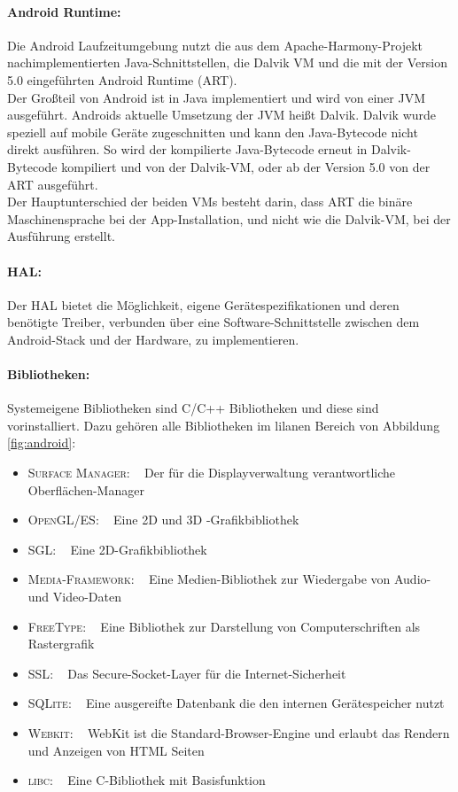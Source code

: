 \paragraph{Android Runtime: }
Die Android Laufzeitumgebung nutzt die aus dem Apache-Harmony-Projekt nachimplementierten Java-Schnittstellen, die Dalvik \gls{VM} und die mit der Version 5.0 eingeführten Android Runtime (ART). \cite{android_5}\\
Der Großteil von Android ist in Java implementiert und wird von einer \gls{JVM} ausgeführt. Androids aktuelle Umsetzung der \gls{JVM} heißt Dalvik. Dalvik wurde speziell auf mobile Geräte zugeschnitten und kann den Java-Bytecode nicht direkt ausführen. So wird der kompilierte Java-Bytecode erneut in Dalvik-Bytecode kompiliert und von der Dalvik-\gls{VM}, oder ab der Version 5.0 von der ART ausgeführt.\\
Der Hauptunterschied der beiden \glspl{VM} besteht darin, dass ART die binäre Maschinensprache bei der \gls{App}-Installation, und nicht wie die Dalvik-\gls{VM}, bei der Ausführung erstellt.
\paragraph{\gls{HAL}: }
Der \gls{HAL} bietet die Möglichkeit, eigene Gerätespezifikationen und deren benötigte Treiber, verbunden über eine Software-Schnittstelle zwischen dem Android-Stack und der Hardware, zu implementieren. \cite{android_hal}
\paragraph{Bibliotheken: }
Systemeigene Bibliotheken sind C/C++ Bibliotheken und diese sind vorinstalliert. Dazu gehören alle Bibliotheken im lilanen Bereich von Abbildung \ref{fig:android}:
\begin{itemize}[leftmargin=0.7cm]
\renewcommand\labelitemi{--}
	\item \textsc{Surface Manager}: ~ Der für die Displayverwaltung verantwortliche Oberflächen-Manager
	\item \textsc{OpenGL/ES}: ~ Eine 2D und 3D -Grafikbibliothek
	\item \textsc{SGL}: ~ Eine 2D-Grafikbibliothek
 	\item \textsc{Media-Framework}: ~ Eine Medien-Bibliothek zur Wiedergabe von Audio- und Video-Daten 	
 	\item \textsc{FreeType}: ~ Eine Bibliothek zur Darstellung von Computerschriften als Rastergrafik
 	\item \textsc{SSL}: ~ Das Secure-Socket-Layer für die Internet-Sicherheit
	\item \textsc{SQLite}: ~ Eine ausgereifte Datenbank die den internen Gerätespeicher nutzt 
	\item \textsc{Webkit}: ~ WebKit ist die Standard-Browser-Engine und erlaubt das Rendern und Anzeigen von HTML Seiten
	\item \textsc{libc}: ~ Eine C-Bibliothek mit Basisfunktion
\end{itemize}
